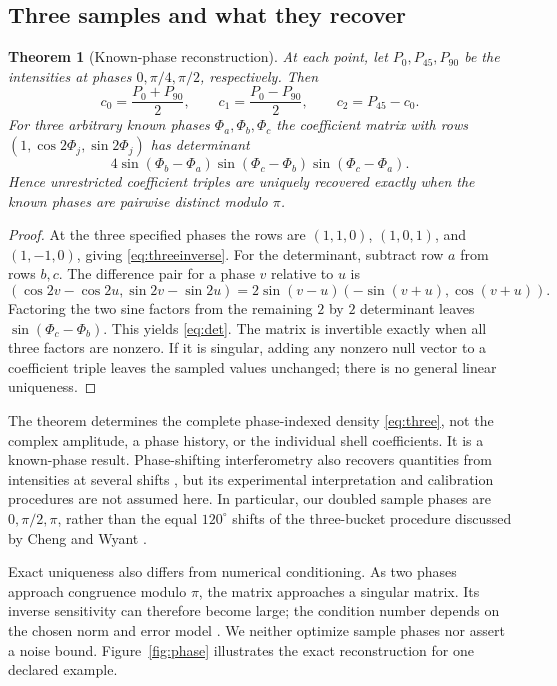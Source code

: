 \documentclass[11pt,a4paper]{article}
\newtheorem{theorem}{Theorem}[section]
\theoremstyle{definition}
\theoremstyle{remark}
\begin{document}
\subsection{Three samples and what they recover}
\begin{theorem}[Known-phase reconstruction]
\label{thm:reconstruction}
At each point, let $P_0,P_{45},P_{90}$ be the intensities at
phases $0,\pi/4,\pi/2$, respectively. Then
\begin{equation}
 c_0=\frac{P_0+P_{90}}2,\qquad
 c_1=\frac{P_0-P_{90}}2,\qquad
 c_2=P_{45}-c_0.
 \label{eq:threeinverse}
\end{equation}
For three arbitrary known phases $\Phi_a,\Phi_b,\Phi_c$ the
coefficient matrix with rows $(1,\cos2\Phi_j,\sin2\Phi_j)$ has
determinant
\begin{equation}
 4\sin(\Phi_b-\Phi_a)\sin(\Phi_c-\Phi_b)
       \sin(\Phi_c-\Phi_a).
 \label{eq:det}
\end{equation}
Hence unrestricted coefficient triples are uniquely recovered
exactly when the known phases are pairwise distinct modulo $\pi$.
\end{theorem}
\begin{proof}
At the three specified phases the rows are $(1,1,0)$,
$(1,0,1)$, and $(1,-1,0)$, giving \eqref{eq:threeinverse}.
For the determinant, subtract row $a$ from rows $b,c$.
The difference pair for a phase $v$ relative to $u$ is
\[
 (\cos2v-\cos2u,\sin2v-\sin2u)
 =2\sin(v-u)(-\sin(v+u),\cos(v+u)).
 \]
Factoring the two sine factors from the remaining $2$ by $2$
determinant leaves $\sin(\Phi_c-\Phi_b)$. This yields
\eqref{eq:det}. The matrix is invertible exactly when all
three factors are nonzero. If it is singular, adding any
nonzero null vector to a coefficient triple leaves the sampled
values unchanged; there is no general linear uniqueness.
\end{proof}

The theorem determines the complete phase-indexed density
\eqref{eq:three}, not the complex amplitude, a phase history,
or the individual shell coefficients. It is a known-phase
result. Phase-shifting interferometry also recovers quantities
from intensities at several shifts \cite[Sec.~I]{chengWyant},
but its experimental interpretation and calibration procedures
are not assumed here. In particular, our doubled sample phases
are $0,\pi/2,\pi$, rather than the equal $120^\circ$ shifts
of the three-bucket procedure discussed by Cheng and Wyant
\cite[Sec.~III.C]{chengWyant}.

Exact uniqueness also differs from numerical conditioning.
As two phases approach congruence modulo $\pi$, the matrix
approaches a singular matrix. Its inverse sensitivity can
therefore become large; the condition number depends on the
chosen norm and error model \cite{higham}. We neither optimize
sample phases nor assert a noise bound. Figure~\ref{fig:phase}
illustrates the exact reconstruction for one declared example.
\end{document}
